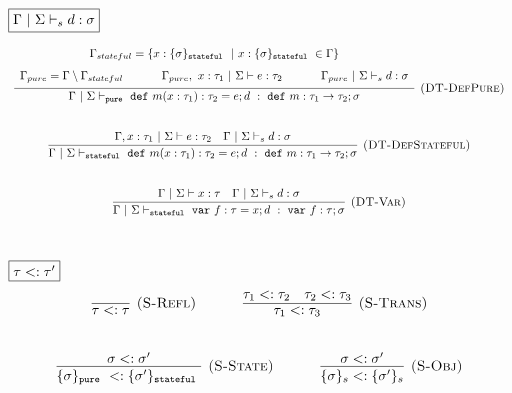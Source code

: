\documentclass{llncs}
\newcommand{\keywadj}[1]{\mathtt{#1}}
\newcommand{\keyw}[1]{\keywadj{#1}~}
\begin{document}
$\fbox{$\Gamma~|~\Sigma \vdash_s d : \sigma$}$
\[
\begin{array}{c}

\infer[\textsc{(DT-DefPure)}]
  {\Gamma~|~\Sigma \vdash_{\keyw{pure}} \keyw{def} m(x : \tau_1) : \tau_2 = e; d~:~\keyw{def} m : \tau_1 \rightarrow \tau_2; \sigma}
  {\def\arraystretch{1.6}
  \begin{array}{c}
\Gamma_{stateful} = \{x : \{ \sigma \}_{\keyw{stateful}} ~|~ x : \{ \sigma \}_{\keyw{stateful}} \in \Gamma\} \\
\Gamma_{pure} = \Gamma \setminus \Gamma_{stateful}~~~~~~~~~~\Gamma_{pure},~x : \tau_1~|~\Sigma \vdash e : \tau_2~~~~~~~~~~\Gamma_{pure}~|~\Sigma \vdash_s d : \sigma
  \end{array}}\\[5ex]

\infer[\textsc{(DT-DefStateful)}]
  {\Gamma~|~\Sigma \vdash_{\keyw{stateful}} \keyw{def} m(x : \tau_1) : \tau_2 = e; d~:~\keyw{def} m : \tau_1 \rightarrow \tau_2; \sigma}
  {\Gamma, x : \tau_1~|~\Sigma \vdash e : \tau_2 & \Gamma~|~\Sigma \vdash_s d : \sigma}\\[5ex]

\infer[\textsc{(DT-Var)}]
  {\Gamma~|~\Sigma \vdash_{\keyw{stateful}} \keyw{var} f : \tau = x; d~:~\keyw{var} f : \tau; \sigma}
  {\Gamma~|~\Sigma \vdash x : \tau & \Gamma~|~\Sigma \vdash_s d : \sigma}\\[5ex]

\end{array}
\]

$\fbox{$\tau <: \tau'$}$
\[
\begin{array}{c}
\infer[\textsc{(S-Refl)}]
  {\tau <: \tau}
  {}%
~~~~~~~~~~
\infer[\textsc{(S-Trans)}]
  {\tau_1 <: \tau_3}
  {\tau_1 <: \tau_2 & \tau_2 <: \tau_3}\\[5ex]

\infer[\textsc{(S-State)}]
  {\{ \sigma \}_{\keyw{pure}} <: \{ \sigma' \}_{\keyw{stateful}}}
  {\sigma <: \sigma'}%
~~~~~~~~~~
\infer[\textsc{(S-Obj)}]
  {\{ \sigma \}_{s} <: \{ \sigma' \}_{s}}
  {\sigma <: \sigma'}\\[5ex]  

\end{array}
\]
\end{document}
